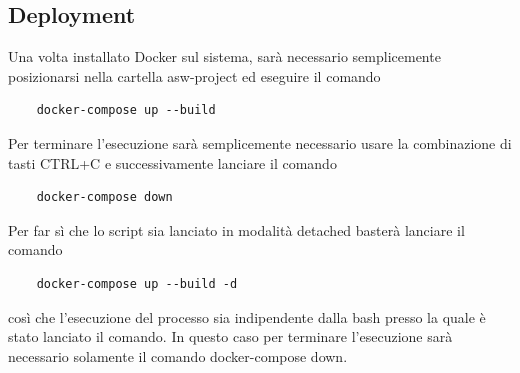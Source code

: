 \subsection{Deployment}
Una volta installato Docker sul sistema, sarà necessario semplicemente posizionarsi nella cartella asw-project ed eseguire il comando 
\begin{verbatim}
    docker-compose up --build
\end{verbatim}
Per terminare l'esecuzione sarà semplicemente necessario usare la combinazione di tasti CTRL+C e successivamente lanciare il comando
\begin{verbatim}
    docker-compose down
\end{verbatim}
Per far sì che lo script sia lanciato in modalità detached basterà lanciare il comando
\begin{verbatim}
    docker-compose up --build -d
\end{verbatim}
così che l'esecuzione del processo sia indipendente dalla bash presso la quale è stato lanciato il comando.\newline
\noindent In questo caso per terminare l'esecuzione sarà necessario solamente il comando docker-compose down.